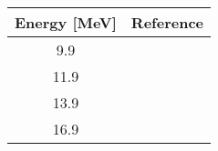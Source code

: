 \begin{tabular}{|c||c|} 
 \hline 
\bf{Energy [MeV]} & \bf{Reference} \\
 \hline
 \hline 
 9.9 & \cite{Tornow82}\\
11.9 & \cite{Tornow82}\\
13.9 & \cite{Honore86}\\
16.9 & \cite{Honore86}\\
\hline\end{tabular}
